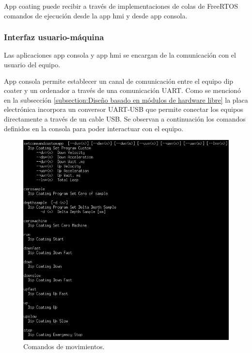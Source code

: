  

App coating puede recibir a través de implementaciones de colas de FreeRTOS comandos de ejecución desde la app hmi y desde app consola.

\subsubsection{Interfaz usuario-máquina}
Las aplicaciones app consola y app hmi se encargan de la comunicación con el usuario del equipo.
 
App consola permite establecer un canal de comunicación entre el equipo dip coater y un ordenador a través de una comunicación UART. Como se mencionó en la subsección \ref{subsection:Diseño basado en módulos de hardware libre} la placa electrónica incorpora un conversor UART-USB que permite conectar los equipos directamente a través de un cable USB. Se observan a continuación los comandos definidos en la consola para poder interactuar con el equipo.

\begin{figure}[h!]
	\centering
	\includegraphics[width=1\textwidth]{./Figures/consola_2.png}
	\caption{Comandos de movimientos.}
	\label{fig:consola_movimientos}
\end{figure}

